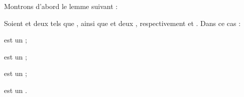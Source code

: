     Montrons d'abord le lemme suivant :
    \begin{lemma}{}{}
        Soient  et  deux  tels que \hg{$\Sigma_1 \cap \Sigma_2 \neq \emptyset$}, ainsi que  et  deux , respectivement  et . Dans ce cas :
        \begin{enumerate}
            \itast {} est un  ;

            \itast {} est un  ;
            
            \itast {} est un  ;
            
            \itast {} est un .
        \end{enumerate}
    \end{lemma}
    
